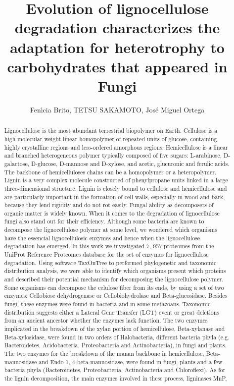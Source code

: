 \documentclass[twoside]{article}
\title{\vspace{-15mm}\fontsize{24pt}{10pt}\selectfont\textbf{ Evolution of lignocellulose degradation characterizes the adaptation for heterotrophy to carbohydrates that appeared in Fungi }} %
\author{ Fen\'{\i}cia Brito, TETSU SAKAMOTO, Jos\'e Miguel Ortega }
\affil{ Universidade Federal de Minas Gerais }
\date{}
\begin{document}
  
  
  \maketitle %
  
  
  \thispagestyle{fancy} %
  
  
  \begin{abstract}
  Lignocellulose is the most abundant terrestrial biopolymer on Earth. Cellulose is a high molecular weight linear homopolymer of repeated units of glucose,  containing highly crystalline regions and less-ordered amorphous regions. Hemicellulose is a linear and branched heterogeneous polymer typically composed of five sugars: L-arabinose,  D-galactose,  D-glucose,  D-mannose and D-xylose,  and acetic,  glucuronic and ferulic acids. The backbone of hemicelluloses chains can be a homopolymer or a heteropolymer. Lignin is a very complex molecule constructed of phenylpropane units linked in a large three-dimensional structure. Lignin is closely bound to cellulose and hemicellulose and are particularly important in the formation of cell walls,  especially in wood and bark,  because they lend rigidity and do not rot easily. Fungal ability as decomposers of organic matter is widely known. When it comes to the degradation of lignocellulose fungi also stand out for their efficiency. Although some bacteria are known to decompose the lignocellulose polymer at some level,  we wondered which organisms have the essencial lignocellulosic enzymes and hence when the lignocellulose degradation has emerged. In this work we investigated 7, 957 proteomes from the UniProt Reference Proteomes database for the set of enzymes for lignocellulose degradation. Using software TaxOnTree to performed phylogenetic and taxonomic distribution analysis,  we were able to identify which organisms present which proteins and described their potential mechanism for decomposing the lignocellulose polymer. Some organisms can decompose the celulose fiber from its ends,  by using a set of two enzymes: Cellobiose dehydrogenase or Cellobiohydrolase and Beta-glucosidase. Besides fungi,  these enzymes were found in bacteria and in some metazoans. Taxonomic distribution suggests either a Lateral Gene Transfer (LGT) event or great deletions from an ancient ancestor whether the enzymes lack function. The two enzymes implicated in the breakdown of the xylan portion of hemicellulose,  Beta-xylanase and Beta-xylosidase,  were found in two orders of Halobacteria,  different bacteria phyla (e.g. Bacteroidetes,  Acidobacteria,  Proteobacteria and Actinobacteria),  in fungi and plants. The two enzymes for the breakdown of the manan backbone in hemicellulose,  Beta-mannosidase and Endo-1, 4-beta-mannosidase,  were found in fungi,  plants and a few bacteria phyla (Bacteroidetes,  Proteobacteria,  Actinobacteria and Chloroflexi). As for the lignin decomposition,  the main enzymes involved in these process,  ligninases MnP,  
\end{abstract}
\end{document}
